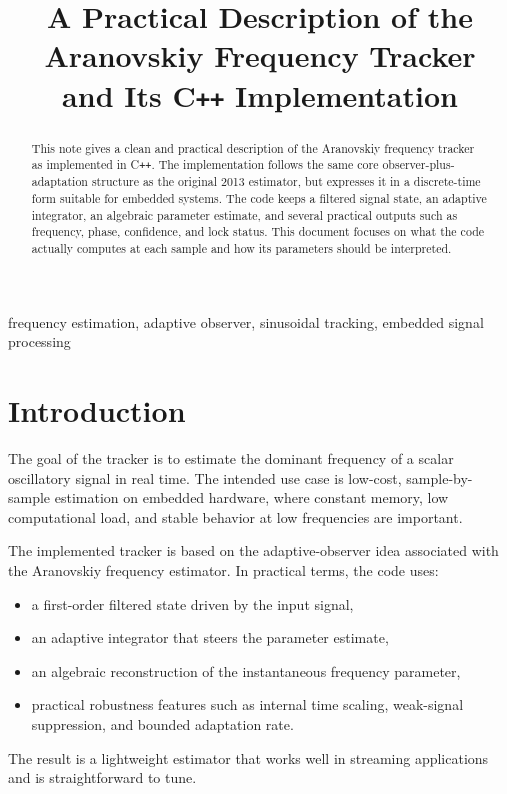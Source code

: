 \documentclass[conference]{IEEEtran}
\title{A Practical Description of the Aranovskiy Frequency Tracker\\
and Its C\texttt{++} Implementation}
\author{%
  \IEEEauthorblockN{Mikhail S.\ Grushinskiy}
  \IEEEauthorblockA{Independent Researcher\\
  Bareboat Necessities Project\\
  \texttt{mgrouch@users.github.com}}
}
\begin{document}
\maketitle

\begin{abstract}
This note gives a clean and practical description of the Aranovskiy
frequency tracker as implemented in C\texttt{++}. The implementation follows
the same core observer-plus-adaptation structure as the original 2013
estimator, but expresses it in a discrete-time form suitable for embedded
systems. The code keeps a filtered signal state, an adaptive integrator,
an algebraic parameter estimate, and several practical outputs such as
frequency, phase, confidence, and lock status. This document focuses on what
the code actually computes at each sample and how its parameters should be
interpreted.
\end{abstract}

\begin{IEEEkeywords}
frequency estimation, adaptive observer, sinusoidal tracking, embedded signal processing
\end{IEEEkeywords}

\section{Introduction}

The goal of the tracker is to estimate the dominant frequency of a scalar
oscillatory signal in real time. The intended use case is low-cost,
sample-by-sample estimation on embedded hardware, where constant memory,
low computational load, and stable behavior at low frequencies are important.

The implemented tracker is based on the adaptive-observer idea associated
with the Aranovskiy frequency estimator. In practical terms, the code uses:
\begin{itemize}
  \item a first-order filtered state driven by the input signal,
  \item an adaptive integrator that steers the parameter estimate,
  \item an algebraic reconstruction of the instantaneous frequency parameter,
  \item practical robustness features such as internal time scaling,
        weak-signal suppression, and bounded adaptation rate.
\end{itemize}

The result is a lightweight estimator that works well in streaming
applications and is straightforward to tune.
\end{document}
